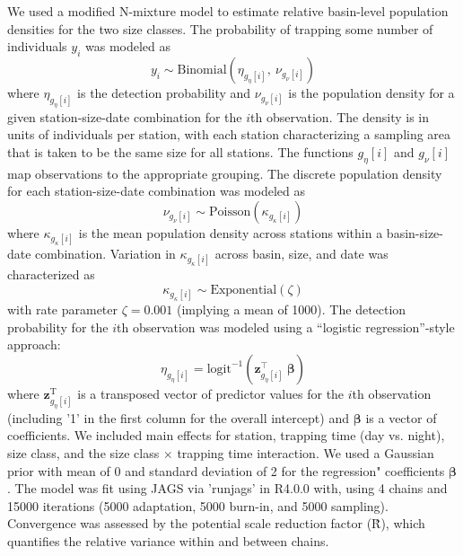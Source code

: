 We used a modified N-mixture model to estimate relative basin-level population densities
for the two size classes.
The probability of trapping some number of individuals $y_i$ 
was modeled as
%
\begin{equation}
  y_i \sim \text{Binomial}\left(\eta_{g_{\eta}[i]}, ~\nu_{g_{\nu}[i]}\right)
\end{equation}
%
where $\eta_{g_{\eta}[i]}$ is the detection probability 
and $\nu_{g_{\nu}[i]}$ is the population density for a given 
station-size-date combination for the $i$th observation.
The density is in units of individuals per station, 
with each station characterizing a sampling area that is 
taken to be the same size for all stations.
The functions ${g_{\eta}[i]}$ and ${g_{\nu}[i]}$ map observations to the 
appropriate grouping. 
The discrete population density for each station-size-date combination was modeled as
%
\begin{equation}
  \nu_{g_{\nu}[i]} \sim \text{Poisson}\left(\kappa_{g_{\kappa}[i]}\right)
\end{equation}
%
where $\kappa_{g_{\kappa}[i]}$ is the mean population density across stations 
within a basin-size-date combination. 
Variation in $\kappa_{g_{\kappa}[i]}$ across basin, size, 
and date was characterized as 
%
\begin{equation}
  \kappa_{g_{\kappa}[i]} \sim 
    \text{Exponential}\left(\zeta \right)
\end{equation}
%
with rate parameter $\zeta = 0.001$ (implying a mean of 1000).
The detection probability for the $i$th observation was modeled using a 
``logistic regression''-style approach:
%
\begin{equation}
  \eta_{g_{\eta}[i]} = 
    \text{logit}^{-1}\left(\mathbf{z}_{g_{\eta}[i]}^\top~{\boldsymbol\beta}\right)
\end{equation}
%
\noindent where $\mathbf{z}_{g_{\eta}[i]}^\text{T}$ is a transposed vector 
of predictor values for the $i$th observation
(including '1' in the first column for the overall intercept)
and $\boldsymbol\beta$ is a vector of coefficients. 
We included main effects for station, trapping time (day vs. night), size class,
and the size class $\times$ trapping time interaction.
We used a Gaussian prior with mean of 0 and standard deviation of 2 
for the regression" coefficients $\boldsymbol\beta$.
The model was fit using JAGS via 'runjags' in R4.0.0 with,
using 4 chains and 15000 iterations (5000 adaptation, 5000 burn-in, and 5000 sampling).
Convergence was assessed by the potential scale reduction factor (\^{R}),
which quantifies the relative variance within and between chains. 



